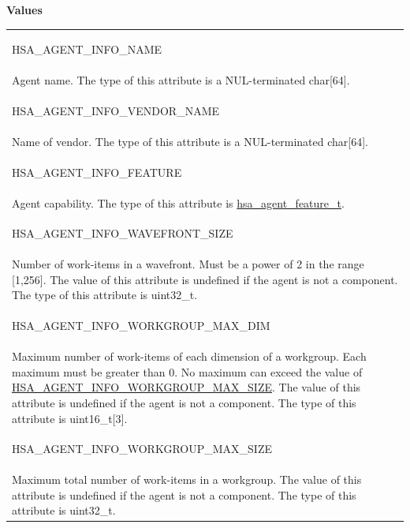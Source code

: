 \documentclass[final]{book}
\newcommand{\reftyp}[1]{#1}
\newcommand{\refenu}[1]{\reftyp{#1}}
\begin{document}
\noindent\textbf{Values}\\[-5mm]
\begin{longtable}{@{\hspace{2em}}p{\linewidth-2em}}
\hspace{-2em}\hypertarget{group__agentinfo_1gga39d0684207d95717d96319573b3e4a42a06b3ca6080e3bfd4d5b07db91d766e4c}{\refenu{HSA_\-AGENT_\-INFO_\-NAME}} \\Agent name. The type of this attribute is a NUL-terminated char[64].\\[2mm]
\hspace{-2em}\hypertarget{group__agentinfo_1gga39d0684207d95717d96319573b3e4a42ac9e0c3d4f881d6de12ff8792eb92292c}{\refenu{HSA_\-AGENT_\-INFO_\-VENDOR_\-NAME}} \\Name of vendor. The type of this attribute is a NUL-terminated char[64].\\[2mm]
\hspace{-2em}\hypertarget{group__agentinfo_1gga39d0684207d95717d96319573b3e4a42a4ce35a53f20e53b76c7cc7697f08ea04}{\refenu{HSA_\-AGENT_\-INFO_\-FEATURE}} \\Agent capability. The type of this attribute is \hyperlink{group__agentinfo_1gadf226614ab6da93b301f100cfd58e504}{hsa_\-agent_\-feature_\-t}.\\[2mm]
\hspace{-2em}\hypertarget{group__agentinfo_1gga39d0684207d95717d96319573b3e4a42a2474a5a57ecbf494156769f408ded8fd}{\refenu{HSA_\-AGENT_\-INFO_\-WAVEFRONT_\-SIZE}} \\Number of work-items in a wavefront. Must be a power of 2 in the range [1,256]. The value of this attribute is undefined if the agent is not a component. The type of this attribute is uint32_\-t.\\[2mm]
\hspace{-2em}\hypertarget{group__agentinfo_1gga39d0684207d95717d96319573b3e4a42a595eea133327c6c6110c02a0661a06d6}{\refenu{HSA_\-AGENT_\-INFO_\-WORKGROUP_\-MAX_\-DIM}} \\Maximum number of work-items of each dimension of a workgroup. Each maximum must be greater than 0. No maximum can exceed the value of \hyperlink{group__agentinfo_1gga39d0684207d95717d96319573b3e4a42ade0ccd571bdc023d644d2337621e91f6}{HSA_\-AGENT_\-INFO_\-WORKGROUP_\-MAX_\-SIZE}. The value of this attribute is undefined if the agent is not a component. The type of this attribute is uint16_t[3].\\[2mm]
\hspace{-2em}\hypertarget{group__agentinfo_1gga39d0684207d95717d96319573b3e4a42ade0ccd571bdc023d644d2337621e91f6}{\refenu{HSA_\-AGENT_\-INFO_\-WORKGROUP_\-MAX_\-SIZE}} \\Maximum total number of work-items in a workgroup. The value of this attribute is undefined if the agent is not a component. The type of this attribute is uint32_\-t.\\[2mm]

\end{longtable}
\end{document}
